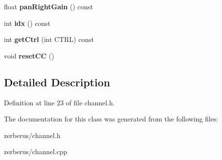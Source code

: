 \begin{DoxyCompactItemize}
\mbox{\label{class_channel_af419f110302dcf5384047dd8f59d3414}} 
float {\bfseries pan\+Right\+Gain} () const
\item 
\mbox{\label{class_channel_a6ba77ceacf72edf70860eb679d5d003d}} 
int {\bfseries idx} () const
\item 
\mbox{\label{class_channel_a6255995be27c2fb5063e9b3b39fbd70b}} 
int {\bfseries get\+Ctrl} (int C\+T\+RL) const
\item 
\mbox{\label{class_channel_a5c91a3ec525b6d6a54cec055f03be789}} 
void {\bfseries reset\+CC} ()
\end{DoxyCompactItemize}


\subsection{Detailed Description}


Definition at line 23 of file channel.\+h.



The documentation for this class was generated from the following files\+:\begin{DoxyCompactItemize}
\item 
zerberus/channel.\+h\item 
zerberus/channel.\+cpp\end{DoxyCompactItemize}
